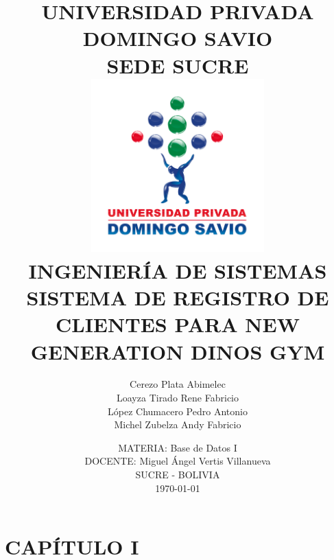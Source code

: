 \documentclass[12pt, letterpaper]{article}
\begin{document}
\title{
    \vspace*{-2cm}
    UNIVERSIDAD PRIVADA DOMINGO SAVIO\\
    SEDE SUCRE\\
    \vspace{0.5cm}
    \includegraphics[width=0.5\textwidth]{logo_upds.png}\\
    \vspace{0.5cm} 
    INGENIERÍA DE SISTEMAS\\
    \vspace{1cm}
    SISTEMA DE REGISTRO DE CLIENTES PARA \textbf{NEW GENERATION DINOS GYM}
}
\author{
    Cerezo Plata Abimelec \\
    Loayza Tirado Rene Fabricio \\
    López Chumacero Pedro Antonio \\
    Michel Zubelza Andy Fabricio
}
\date{
    MATERIA: Base de Datos I \\
    DOCENTE: Miguel Ángel Vertis Villanueva \\
    \vspace{1cm}
    SUCRE - BOLIVIA \\
    \today
}

\maketitle
\thispagestyle{empty}
\newpage
\clearpage

\tableofcontents
\thispagestyle{empty}
\newpage
\clearpage

\listoffigures
{}
\thispagestyle{empty}
\newpage
\clearpage

\setcounter{page}{1}
\section*{CAPÍTULO I}
\setcounter{section}{1}
\end{document}
